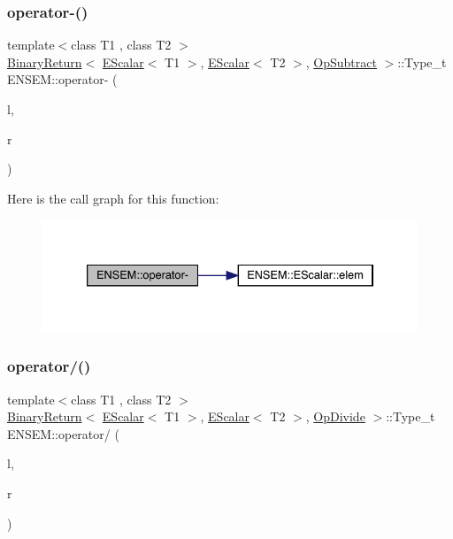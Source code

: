 \subsubsection{\texorpdfstring{operator-\/()}{operator-()}\hspace{0.1cm}{\footnotesize\ttfamily [2/2]}}
{\footnotesize\ttfamily template$<$class T1 , class T2 $>$ \\
\mbox{\hyperlink{structENSEM_1_1BinaryReturn}{Binary\+Return}}$<$ \mbox{\hyperlink{classENSEM_1_1EScalar}{E\+Scalar}}$<$ T1 $>$, \mbox{\hyperlink{classENSEM_1_1EScalar}{E\+Scalar}}$<$ T2 $>$, \mbox{\hyperlink{structENSEM_1_1OpSubtract}{Op\+Subtract}} $>$\+::Type\+\_\+t E\+N\+S\+E\+M\+::operator-\/ (\begin{DoxyParamCaption}\item[{const \mbox{\hyperlink{classENSEM_1_1EScalar}{E\+Scalar}}$<$ T1 $>$ \&}]{l,  }\item[{const \mbox{\hyperlink{classENSEM_1_1EScalar}{E\+Scalar}}$<$ T2 $>$ \&}]{r }\end{DoxyParamCaption})\hspace{0.3cm}{\ttfamily [inline]}}

Here is the call graph for this function\+:
\nopagebreak
\begin{figure}[H]
\begin{center}
\leavevmode
\includegraphics[width=333pt]{d4/dca/group__escalar_gaab8719cf0db585f9ffd1685fff3e96d4_cgraph}
\end{center}
\end{figure}
\mbox{\label{group__escalar_ga6afeb39f3b92a8cfc99b5dc1689d0488}} 
\subsubsection{\texorpdfstring{operator/()}{operator/()}}
{\footnotesize\ttfamily template$<$class T1 , class T2 $>$ \\
\mbox{\hyperlink{structENSEM_1_1BinaryReturn}{Binary\+Return}}$<$ \mbox{\hyperlink{classENSEM_1_1EScalar}{E\+Scalar}}$<$ T1 $>$, \mbox{\hyperlink{classENSEM_1_1EScalar}{E\+Scalar}}$<$ T2 $>$, \mbox{\hyperlink{structENSEM_1_1OpDivide}{Op\+Divide}} $>$\+::Type\+\_\+t E\+N\+S\+E\+M\+::operator/ (\begin{DoxyParamCaption}\item[{const \mbox{\hyperlink{classENSEM_1_1EScalar}{E\+Scalar}}$<$ T1 $>$ \&}]{l,  }\item[{const \mbox{\hyperlink{classENSEM_1_1EScalar}{E\+Scalar}}$<$ T2 $>$ \&}]{r }\end{DoxyParamCaption})\hspace{0.3cm}{\ttfamily [inline]}}

